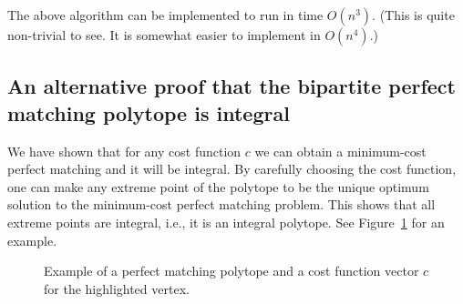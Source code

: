 The above algorithm can be implemented to run in time $O(n^3)$. (This is quite non-trivial to see.
It is somewhat easier to implement in $O(n^4)$.)

\subsection*{An alternative proof that the bipartite perfect matching polytope is integral}

We have shown that for any cost function $c$ we can obtain a minimum-cost perfect matching and it
will be integral. By carefully choosing the cost function, one can make any extreme point of the
polytope to be the unique optimum solution to the minimum-cost perfect matching problem. This
shows that all extreme points are integral, i.e., it is an integral polytope. See Figure~\ref{fig:poly}
for an example.

\begin{figure}[h]
\centering
{}
\caption{Example of a perfect matching polytope and a cost function vector $c$ for the highlighted
vertex.}
\label{fig:poly}
\end{figure}
% 
